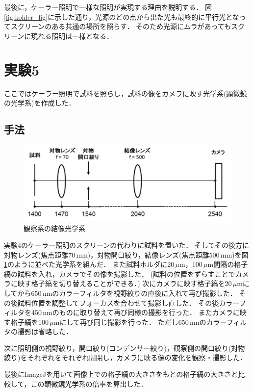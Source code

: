 \documentclass[titlepage]{jsarticle}
\begin{document}
最後に，ケーラー照明で一様な照明が実現する理由を説明する．
図\ref{fig:kohler_fig}に示した通り，光源のどの点から出た光も最終的に平行光となってスクリーンのある共通の場所を照らす．
そのため光源にムラがあってもスクリーンに現れる照明は一様となる．

\section{実験5}
ここではケーラー照明で試料を照らし，試料の像をカメラに映す光学系(顕微鏡の光学系)を作成した．

\subsection{手法}

\begin{figure}
    \centering
    \includegraphics[width=13cm]{obj.png}
    \caption{観察系の結像光学系}
    \label{fig:obj}
\end{figure}

実験4のケーラー照明のスクリーンの代わりに試料を置いた．
そしてその後方に対物レンズ(焦点距離70\,mm)，対物開口絞り，結像レンズ(焦点距離500\,mm)を図\ref{fig:obj}のように並べた光学系を組んだ．
また試料ホルダに20\,$\mu$m，100\,$\mu$m間隔の格子縞の試料を入れ，カメラでその像を撮影した．
(試料の位置をずらすことでカメラに映す格子縞を切り替えることができる．)
次にカメラに映す格子縞を20\,$\mu$mにしてから650\,nmのカラーフィルタを視野絞りの直後に入れて再び撮影した．
その後試料位置を調整してフォーカスを合わせて撮影し直した．
その後カラーフィルタを450\,nmのものに取り替えて再び同様の撮影を行った．
またカメラに映す格子縞を100\,$\mu$mにして再び同じ撮影を行った．
ただし650\,nmのカラーフィルタの撮影は省略した．

次に照明側の視野絞り，開口絞り(コンデンサー絞り)，観察側の開口絞り(対物絞り)をそれぞれをそれぞれ開閉し，カメラに映る像の変化を観察・撮影した．

最後にImageJを用いて画像上での格子縞の大きさをもとの格子縞の大きさと比較して，この顕微鏡光学系の倍率を算出した．
\end{document}
